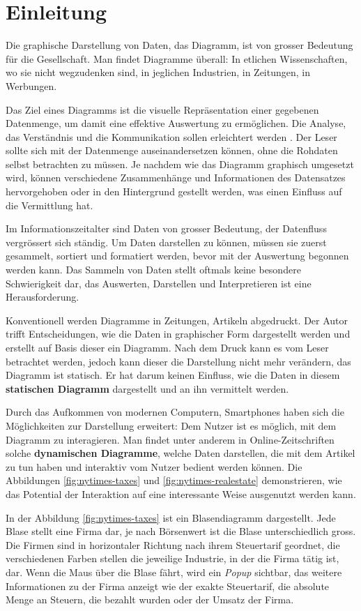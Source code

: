 \chapter{Einleitung}
Die graphische Darstellung von Daten, das Diagramm, ist von grosser Bedeutung für die Gesellschaft. Man findet Diagramme überall: In etlichen Wissenschaften, wo sie nicht wegzudenken sind, in jeglichen Industrien, in Zeitungen, in Werbungen.

Das Ziel eines Diagramms ist die visuelle Repräsentation einer gegebenen Datenmenge, um damit eine effektive Auswertung zu ermöglichen. Die Analyse, das Verständnis und die Kommunikation sollen erleichtert werden \cite{viz}. Der Leser sollte sich mit der Datenmenge auseinandersetzen können, ohne die Rohdaten selbst betrachten zu müssen. Je nachdem wie das Diagramm graphisch umgesetzt wird, können verschiedene Zusammenhänge und Informationen des Datensatzes hervorgehoben oder in den Hintergrund gestellt werden, was einen Einfluss auf die Vermittlung hat.

Im Informationszeitalter sind Daten von grosser Bedeutung, der Datenfluss vergrössert sich ständig. Um Daten darstellen zu können, müssen sie zuerst gesammelt, sortiert und formatiert werden, bevor mit der Auswertung begonnen werden kann. Das Sammeln von Daten stellt oftmals keine besondere Schwierigkeit dar, das Auswerten, Darstellen und Interpretieren ist eine Herausforderung.

Konventionell werden Diagramme in Zeitungen, Artikeln abgedruckt. Der Autor trifft Entscheidungen, wie die Daten in graphischer Form dargestellt werden und erstellt auf Basis dieser ein Diagramm. Nach dem Druck kann es vom Leser betrachtet werden, jedoch kann dieser die Darstellung nicht mehr verändern, das Diagramm ist statisch. Er hat darum keinen Einfluss, wie die Daten in diesem \textbf{statischen Diagramm} dargestellt und an ihn vermittelt werden.

Durch das Aufkommen von modernen Computern, Smartphones haben sich die Möglichkeiten zur Darstellung erweitert: Dem Nutzer ist es möglich, mit dem Diagramm zu interagieren. Man findet unter anderem in Online-Zeitschriften solche \textbf{dynamischen Diagramme}, welche Daten darstellen, die mit dem Artikel zu tun haben und interaktiv vom Nutzer bedient werden können. Die Abbildungen \ref{fig:nytimes-taxes} und \ref{fig:nytimes-realestate} demonstrieren, wie das Potential der Interaktion auf eine interessante Weise ausgenutzt werden kann.

In der Abbildung \ref{fig:nytimes-taxes} ist ein Blasendiagramm dargestellt. Jede Blase stellt eine Firma dar, je nach Börsenwert ist die Blase unterschiedlich gross. Die Firmen sind in horizontaler Richtung nach ihrem Steuertarif geordnet, die verschiedenen Farben stellen die jeweilige Industrie, in der die Firma tätig ist, dar. Wenn die Maus über die Blase fährt, wird ein \textit{Popup} sichtbar, das weitere Informationen zu der Firma anzeigt wie der exakte Steuertarif, die absolute Menge an Steuern, die bezahlt wurden oder der Umsatz der Firma.

